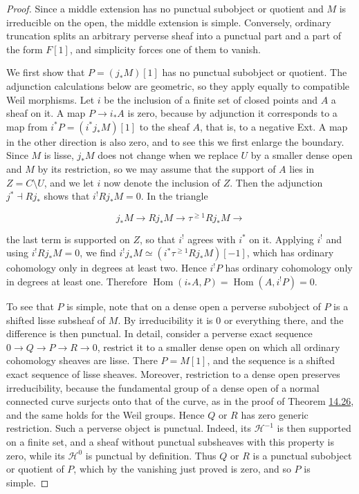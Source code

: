 \documentclass[11pt]{article}
\providecommand{\Hom}{}\renewcommand{\Hom}{\operatorname{Hom}}
\begin{document}
\begin{proof}[{Proof}]\label{bp210}%
Since a middle extension has no punctual subobject or quotient and \(M\) is irreducible on the open, the middle extension is simple. Conversely, ordinary truncation splits an arbitrary perverse sheaf into a punctual part and a part of the form \(F[1]\), and simplicity forces one of them to vanish.

We first show that \(P=(j_*M)[1]\) has no punctual subobject or quotient. The adjunction calculations below are geometric, so they apply equally to compatible Weil morphisms. Let \(i\) be the inclusion of a finite set of closed points and \(A\) a sheaf on it. A map \(P\to i_*A\) is zero, because by adjunction it corresponds to a map from \(i^*P=(i^*j_*M)[1]\) to the sheaf \(A\), that is, to a negative Ext. A map in the other direction is also zero, and to see this we first enlarge the boundary. Since \(M\) is lisse, \(j_*M\) does not change when we replace \(U\) by a smaller dense open and \(M\) by its restriction, so we may assume that the support of \(A\) lies in \(Z=C\setminus U\), and we let \(i\) now denote the inclusion of \(Z\). Then the adjunction \(j^*\dashv Rj_*\) shows that \(i^!Rj_*M=0\). In the triangle

\[
j_*M\longrightarrow Rj_*M\longrightarrow
\tau^{\ge1}Rj_*M\longrightarrow
\]

the last term is supported on \(Z\), so that \(i^!\) agrees with \(i^*\) on it. Applying \(i^!\) and using \(i^!Rj_*M=0\), we find \(i^!j_*M\simeq(i^*\tau^{\ge1}Rj_*M)[-1]\), which has ordinary cohomology only in degrees at least two. Hence \(i^!P\) has ordinary cohomology only in degrees at least one. Therefore \(\Hom(i_*A,P)=\Hom(A,i^!P)=0\).

To see that \(P\) is simple, note that on a dense open a perverse subobject of \(P\) is a shifted lisse subsheaf of \(M\). By irreducibility it is \(0\) or everything there, and the difference is then punctual. In detail, consider a perverse exact sequence \(0\to Q\to P\to R\to0\), restrict it to a smaller dense open on which all ordinary cohomology sheaves are lisse. There \(P=M[1]\), and the sequence is a shifted exact sequence of lisse sheaves. Moreover, restriction to a dense open preserves irreducibility, because the fundamental group of a dense open of a normal connected curve surjects onto that of the curve, as in the proof of Theorem \hyperref[bp120]{14.26}, and the same holds for the Weil groups. Hence \(Q\) or \(R\) has zero generic restriction. Such a perverse object is punctual. Indeed, its \(\mathcal H^{-1}\) is then supported on a finite set, and a sheaf without punctual subsheaves with this property is zero, while its \(\mathcal H^0\) is punctual by definition. Thus \(Q\) or \(R\) is a punctual subobject or quotient of \(P\), which by the vanishing just proved is zero, and so \(P\) is simple.


\end{proof}
\end{document}
